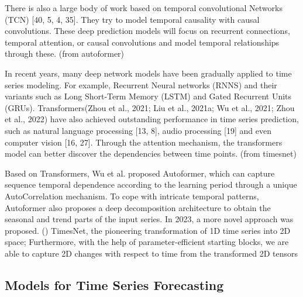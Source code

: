 There is also a large body of work based on temporal convolutional Networks (TCN) [40, 5, 4, 35]. They try to model temporal causality with causal convolutions. These deep prediction models will focus on recurrent connections, temporal attention, or causal convolutions and model temporal relationships through these. (from autoformer)

In recent years, many deep network models have been gradually applied to time series modeling. For example, Recurrent Neural networks (RNNS) and their variants such as Long Short-Term Memory (LSTM) and Gated Recurrent Units (GRUs). Transformers(Zhou et al., 2021;   Liu et al., 2021a;  Wu et al., 2021;  Zhou et al., 2022) have also achieved outstanding performance in time series prediction, such as natural language processing [13, 8], audio processing [19] and even computer vision [16, 27]. Through the attention mechanism, the transformers model can better discover the dependencies between time points. (from timesnet)

Based on Transformers, Wu et al. proposed Autoformer, which can capture sequence temporal dependence according to the learning period through a unique AutoCorrelation mechanism. To cope with intricate temporal patterns, Autoformer also proposes a deep decomposition architecture to obtain the seasonal and trend parts of the input series. In 2023, a more novel approach was proposed. () TimesNet, the pioneering transformation of 1D time series into 2D space; Furthermore, with the help of parameter-efficient starting blocks, we are able to capture 2D changes with respect to time from the transformed 2D tensors


\subsection{Models for Time Series Forecasting}